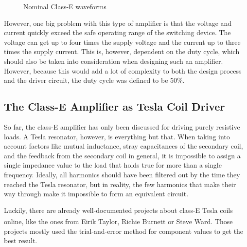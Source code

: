 \begin{figure}[h!]
    \centering
    \caption{Nominal Class-E waveforms}
    \label{fig:nominal-waveforms}
\end{figure}

\pagebreak
However, one big problem with this type of amplifier is that the voltage and current quickly exceed the safe operating range of the switching device. The voltage can get up to four times the supply voltage and the current up to three times the supply current. This is, however, dependent on the duty cycle, which should also be taken into consideration when designing such an amplifier. However, because this would add a lot of complexity to both the design process and the driver circuit, the duty cycle was defined to be 50\%.

\subsection[Class-E for Tesla Coils]{The Class-E Amplifier as Tesla Coil Driver}
\label{subsec:e-for-tesla}

So far, the class-E amplifier has only been discussed for driving purely resistive loads. A Tesla resonator, however, is everything but that. When taking into account factors like mutual inductance, stray capacitances of the secondary coil, and the feedback from the secondary coil in general, it is impossible to assign a single impedance value to the load that holds true for more than a single frequency. Ideally, all harmonics should have been filtered out by the time they reached the Tesla resonator, but in reality, the few harmonics that make their way through make it impossible to form an equivalent circuit.

Luckily, there are already well-documented projects about class-E Tesla coils online, like the ones from Eirik Taylor\textsuperscript{}, Richie Burnett\textsuperscript{} or Steve Ward\textsuperscript{}. Those projects mostly used the trial-and-error method for component values to get the best result.

